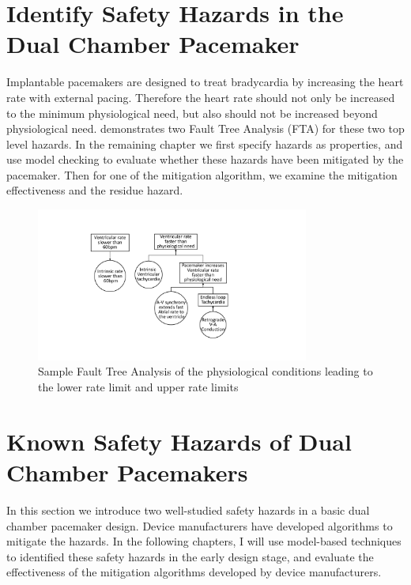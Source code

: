 \section{Identify Safety Hazards in the Dual Chamber Pacemaker}
Implantable pacemakers are designed to treat bradycardia by increasing the heart rate with external pacing. Therefore the heart rate should not only be increased to the minimum physiological need, but also should not be increased beyond physiological need.  demonstrates two Fault Tree Analysis (FTA) for these two top level hazards. In the remaining chapter we first specify hazards as properties, and use model checking to evaluate whether these hazards have been mitigated by the pacemaker. Then for one of the mitigation algorithm, we examine the mitigation effectiveness and the residue hazard.
\begin{figure}[!t]
		\centering
		\includegraphics[width=0.8\textwidth]{figs/risk_requirements.pdf}
		\caption{\small Sample Fault Tree Analysis of the physiological conditions leading to the lower rate limit and upper rate limits}
		\label{fig:risk_req}
\end{figure}

\section{Known Safety Hazards of Dual Chamber Pacemakers}
In this section we introduce two well-studied safety hazards in a basic dual chamber pacemaker design.
Device manufacturers have developed algorithms to mitigate the hazards.
In the following chapters, I will use model-based techniques to identified these safety hazards in the early design stage, and evaluate the effectiveness of the mitigation algorithms developed by device manufacturers.

